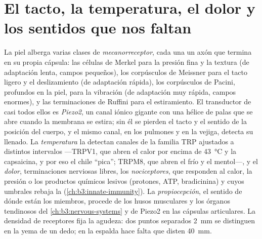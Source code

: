 \section{El tacto, la temperatura, el dolor y los sentidos que nos faltan}

\begin{definition}[La somatosensación]\label{def:b3:sensory-systems:somato}
La piel alberga varias clases de \emph{mecanorreceptor}, cada una un
axón que termina en su propia cápsula: las células de Merkel para la
presión fina y la textura (de adaptación lenta, campos pequeños), los
corpúsculos de Meissner para el tacto ligero y el deslizamiento (de
adaptación rápida), los corpúsculos de Pacini, profundos en la piel,
para la vibración (de adaptación muy rápida, campos enormes), y las
terminaciones de Ruffini para el estiramiento. El transductor de casi
todos ellos es \emph{Piezo2}, un canal iónico gigante con una hélice de
palas que se abre cuando la membrana se estira; sin él se pierden el
tacto y el sentido de la posición del cuerpo, y el mismo canal, en los
pulmones y en la vejiga, detecta su llenado. La \emph{temperatura} la
detectan canales de la familia TRP ajustados a distintos intervalos
---TRPV1, que abren el calor por encima de \qty{43}{\celsius} y la
capsaicina, y por eso el chile ``pica''; TRPM8, que abren el frío y el
mentol---, y el \emph{dolor}, terminaciones nerviosas libres, los
\emph{nociceptores}, que responden al calor, la presión o los productos
químicos lesivos (protones, ATP, bradicinina) y cuyos umbrales rebaja
la  (\cref{ch:b3:innate-immunity}). La
\emph{propiocepción}, el sentido de dónde están los miembros, procede
de los husos musculares y los órganos tendinosos del
\cref{ch:b3:nervous-systems} y de Piezo2 en las cápsulas articulares.
La densidad de receptores fija la agudeza: dos puntos separados
\qty{2}{mm} se distinguen en la yema de un dedo; en la espalda hace
falta que disten \qty{40}{mm}.
\end{definition}

